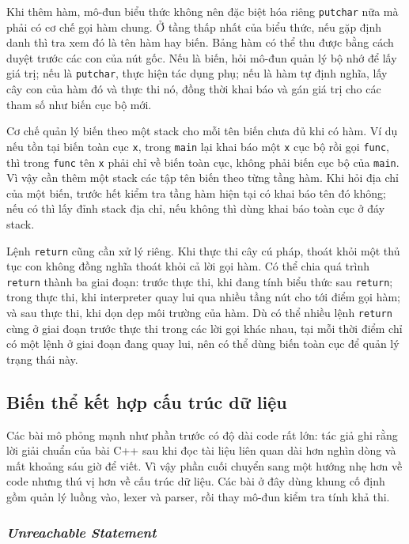 \documentclass[11pt]{article}
\begin{document}
Khi thêm hàm, mô-đun biểu thức không nên đặc biệt hóa riêng \texttt{putchar} nữa
mà phải có cơ chế gọi hàm chung. Ở tầng thấp nhất của biểu thức, nếu gặp định
danh thì tra xem đó là tên hàm hay biến. Bảng hàm có thể thu được bằng cách
duyệt trước các con của nút gốc. Nếu là biến, hỏi mô-đun quản lý bộ nhớ để lấy
giá trị; nếu là \texttt{putchar}, thực hiện tác dụng phụ; nếu là hàm tự định
nghĩa, lấy cây con của hàm đó và thực thi nó, đồng thời khai báo và gán giá trị
cho các tham số như biến cục bộ mới.

Cơ chế quản lý biến theo một stack cho mỗi tên biến chưa đủ khi có hàm. Ví dụ
nếu tồn tại biến toàn cục \texttt{x}, trong \texttt{main} lại khai báo một
\texttt{x} cục bộ rồi gọi \texttt{func}, thì trong \texttt{func} tên
\texttt{x} phải chỉ về biến toàn cục, không phải biến cục bộ của \texttt{main}.
Vì vậy cần thêm một stack các tập tên biến theo từng tầng hàm. Khi hỏi địa chỉ
của một biến, trước hết kiểm tra tầng hàm hiện tại có khai báo tên đó không; nếu
có thì lấy đỉnh stack địa chỉ, nếu không thì dùng khai báo toàn cục ở đáy stack.

Lệnh \texttt{return} cũng cần xử lý riêng. Khi thực thi cây cú pháp, thoát khỏi
một thủ tục con không đồng nghĩa thoát khỏi cả lời gọi hàm. Có thể chia quá
trình \texttt{return} thành ba giai đoạn: trước thực thi, khi đang tính biểu
thức sau \texttt{return}; trong thực thi, khi interpreter quay lui qua nhiều
tầng nút cho tới điểm gọi hàm; và sau thực thi, khi dọn dẹp môi trường của hàm.
Dù có thể nhiều lệnh \texttt{return} cùng ở giai đoạn trước thực thi trong các
lời gọi khác nhau, tại mỗi thời điểm chỉ có một lệnh ở giai đoạn đang quay lui,
nên có thể dùng biến toàn cục để quản lý trạng thái này.

\subsection{Biến thể kết hợp cấu trúc dữ liệu}

Các bài mô phỏng mạnh như phần trước có độ dài code rất lớn: tác giả ghi rằng
lời giải chuẩn của bài C++ sau khi đọc tài liệu liên quan dài hơn nghìn dòng và
mất khoảng sáu giờ để viết. Vì vậy phần cuối chuyển sang một hướng nhẹ hơn về
code nhưng thú vị hơn về cấu trúc dữ liệu. Các bài ở đây dùng khung cố định
gồm quản lý luồng vào, lexer và parser, rồi thay mô-đun kiểm tra tính khả thi.

\subsubsection{\emph{Unreachable Statement}}
\end{document}
